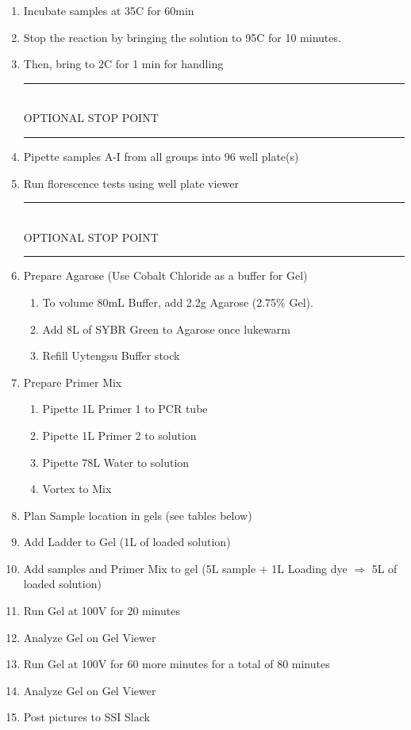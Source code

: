 \documentclass[a4paper,xcolor=table]{article}
\newcommand{\C}{\degree C}
\newcommand{\stopPoint}{\begin{center}
\rule{0.5\textwidth}{.4pt}\\
\vspace{1mm} 
OPTIONAL STOP POINT\\
\rule{0.5\textwidth}{.4pt}
\end{center}}
\newcommand{\uL}{\micro{}L}
\newcommand{\Dilution}[4]{
\subsection{#2}
\begin{enumerate}
\item{Vortex #2 stock}
\item{Pipette #1\uL{} #2 into a PCR Tube}
\item{Pipette #3\uL{} #4 into solution}
\item{Vortex until mixed}
\end{enumerate}
}
\begin{document}
\begin{enumerate}
\begin{figure}[ht]
Note: The dNTPs were originally supposed to be dTTPs, but due to human error, they were not. This is reflected in Figure \ref{table:instOne}.
\end{figure}

\section*{Dilutions}
\Dilution{1}{SYBR Green I}{9}{Water}
\Dilution{2.5}{Primer 1}{22.5}{Water}
\Dilution{2.5}{Primer 2}{22.5}{Water}

\item{Incubate samples at 35\C{} for 60min}
\item{Stop the reaction by bringing the solution to 95\C{} for 10 minutes. }
\item{Then, bring to 2\C{} for 1 min for handling}
\stopPoint
\item{Pipette samples A-I from all groups into 96 well plate(s)}
\item{Run florescence tests using well plate viewer}
\stopPoint
\item{Prepare Agarose (Use Cobalt Chloride as a buffer for Gel)
\begin{enumerate}
    \item{To volume 80mL Buffer, add 2.2g Agarose (2.75\% Gel).}
    \item{Add 8\uL{} of SYBR Green to Agarose once lukewarm}
    \item{Refill Uytengsu Buffer stock}
    \end{enumerate}
}

\item{Prepare Primer Mix
\begin{enumerate}
    \item{Pipette 1\uL{} Primer 1 to PCR tube}
    \item{Pipette 1\uL{} Primer 2 to solution }
    \item{Pipette 78\uL{} Water to solution}
    \item{Vortex to Mix}
    \end{enumerate}
    }
\item{Plan Sample location in gels (see tables below)}
\item{Add Ladder to Gel  (1\uL{} of loaded solution)}
\item{Add samples and Primer Mix to gel (5\uL{} sample + 1\uL{} Loading dye $\Rightarrow$ 5\uL{} of loaded solution)}
\item{Run Gel at 100V for 20 minutes}
\item{Analyze Gel on Gel Viewer}
\item{Run Gel at 100V for 60 more minutes for a total of 80 minutes}
\item{Analyze Gel on Gel Viewer}
\item{Post pictures to SSI Slack}
\end{enumerate}
\end{document}
